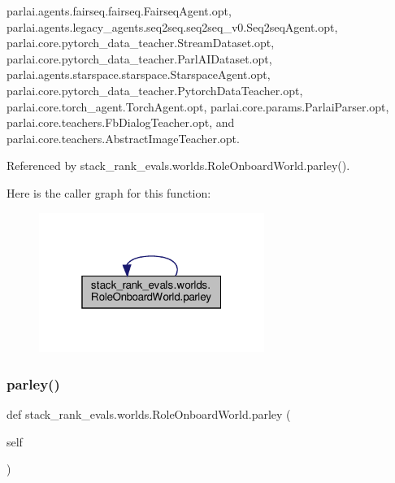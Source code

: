 parlai.\+agents.\+fairseq.\+fairseq.\+Fairseq\+Agent.\+opt, parlai.\+agents.\+legacy\+\_\+agents.\+seq2seq.\+seq2seq\+\_\+v0.\+Seq2seq\+Agent.\+opt, parlai.\+core.\+pytorch\+\_\+data\+\_\+teacher.\+Stream\+Dataset.\+opt, parlai.\+core.\+pytorch\+\_\+data\+\_\+teacher.\+Parl\+A\+I\+Dataset.\+opt, parlai.\+agents.\+starspace.\+starspace.\+Starspace\+Agent.\+opt, parlai.\+core.\+pytorch\+\_\+data\+\_\+teacher.\+Pytorch\+Data\+Teacher.\+opt, parlai.\+core.\+torch\+\_\+agent.\+Torch\+Agent.\+opt, parlai.\+core.\+params.\+Parlai\+Parser.\+opt, parlai.\+core.\+teachers.\+Fb\+Dialog\+Teacher.\+opt, and parlai.\+core.\+teachers.\+Abstract\+Image\+Teacher.\+opt.



Referenced by stack\+\_\+rank\+\_\+evals.\+worlds.\+Role\+Onboard\+World.\+parley().

Here is the caller graph for this function\+:
\nopagebreak
\begin{figure}[H]
\begin{center}
\leavevmode
\includegraphics[width=208pt]{classstack__rank__evals_1_1worlds_1_1RoleOnboardWorld_ad01c1064fd3c5f1ac4746d043f47bfbc_icgraph}
\end{center}
\end{figure}
\mbox{\label{classstack__rank__evals_1_1worlds_1_1RoleOnboardWorld_ad01c1064fd3c5f1ac4746d043f47bfbc}} 
\subsubsection{\texorpdfstring{parley()}{parley()}\hspace{0.1cm}{\footnotesize\ttfamily [2/2]}}
{\footnotesize\ttfamily def stack\+\_\+rank\+\_\+evals.\+worlds.\+Role\+Onboard\+World.\+parley (\begin{DoxyParamCaption}\item[{}]{self }\end{DoxyParamCaption})}



